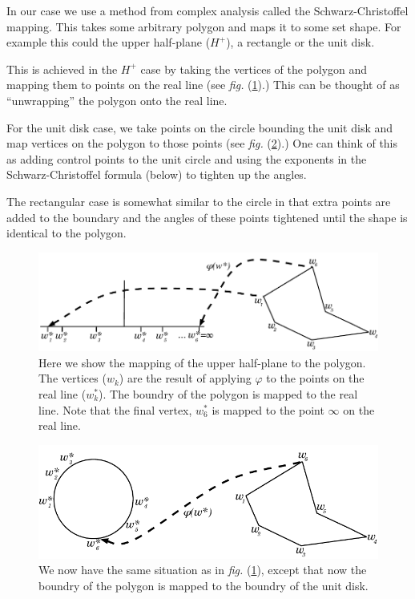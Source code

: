 \documentclass[a4paper,10pt]{amsart}
\newcommand{\sch}{Schwarz-Christoffel }
\newcommand{\fig}[1]{\emph{fig.} (\ref{#1})}
\renewcommand{\phi}{\varphi}
\begin{document}
In our case we use a method from complex analysis called the \sch mapping. This takes some arbitrary polygon and maps it to some set shape. For example this could the upper half-plane ($H^+$), a rectangle or the unit disk. 

This is achieved in the $H^+$ case by taking the vertices of the polygon and mapping them to points on the real line (see \fig{reallinedia}.) This can be thought of as ``unwrapping'' the polygon onto the real line. 

For the unit disk case, we take points on the circle bounding the unit disk and map vertices on the polygon to those points (see \fig{unitdiskdia}.) One can think of this as adding control points to the unit circle and using the exponents in the \sch formula (below) to tighten up the angles.

The rectangular case is somewhat similar to the circle in that extra points are added to the boundary and the angles of these points tightened until the shape is identical to the polygon.

\begin{figure} [tbp]
\centering
\includegraphics[scale=0.6]{figs/reallinedia.pdf}
\caption{Here we show the mapping of the upper half-plane to the polygon. The vertices ($w_k$) are the result of applying $\phi$ to the points on the real line ($w^*_k$). The boundry of the polygon is mapped to the real line. Note that the final vertex, $w^*_6$ is mapped to the point $\infty$ on the real line.}
\label{reallinedia}
\end{figure}

\begin{figure} [tbp]
\centering
\includegraphics[scale=0.6]{figs/unitdiskdia.pdf}
\caption{We now have the same situation as in \fig{reallinedia}, except that now the boundry of the polygon is mapped to the boundry of the unit disk.}
\label{unitdiskdia}
\end{figure}
\end{document}
